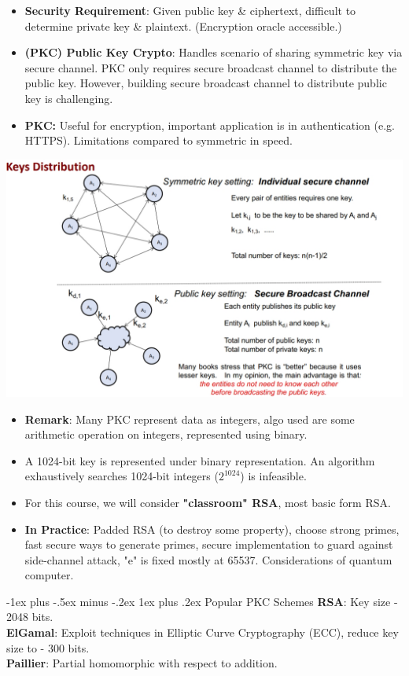 \documentclass[10pt, landscape]{article}
\makeatletter
\renewcommand{\subsubsection}{\@startsection{subsubsection}{3}{0mm}%
                                {-1ex plus -.5ex minus -.2ex}%
                                {1ex plus .2ex}%
                                {\normalfont\small\bfseries}}
\makeatother
\begin{document}
\begin{multicols*}{3}
\begin{itemize}
\item \textbf{Security Requirement}: Given public key \& ciphertext, difficult to determine private key \& plaintext. (Encryption oracle accessible.)
\item \textbf{(PKC) Public Key Crypto}: Handles scenario of sharing symmetric key via secure channel. PKC only requires secure broadcast channel to distribute the public key. However, building secure broadcast channel to distribute public key is challenging.
\item \textbf{PKC:} Useful for encryption, important application is in authentication (e.g. HTTPS). Limitations compared to symmetric in speed.
\end{itemize}
\centerline{\includegraphics[width=1\linewidth]{keyDistribution}}
\begin{itemize}
\item \textbf{Remark}: Many PKC represent data as integers, algo used are some arithmetic operation on integers, represented using binary.
\item A 1024-bit key is represented under binary representation. An algorithm exhaustively searches 1024-bit integers ($2^{1024}$) is infeasible.
\item For this course, we will consider \textbf{"classroom" RSA}, most basic form RSA.
\item \textbf{In Practice}: Padded RSA (to destroy some property), choose strong primes, fast secure ways to generate primes, secure implementation to guard against side-channel attack, "e" is fixed mostly at 65537. Considerations of quantum computer.
\end{itemize}

\subsubsection{Popular PKC Schemes}
\textbf{RSA}: Key size - 2048 bits. \\
\textbf{ElGamal}: Exploit techniques in Elliptic Curve Cryptography (ECC), reduce key size to - 300 bits. \\
\textbf{Paillier}: Partial homomorphic with respect to addition.




\end{multicols*}
\end{document}
